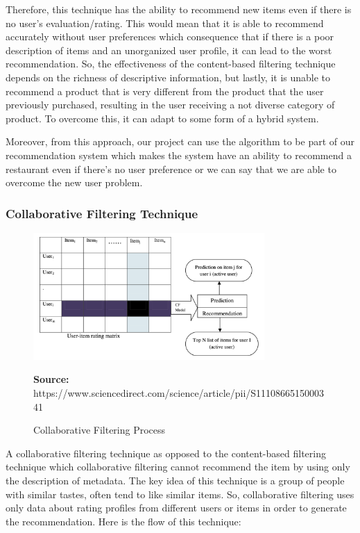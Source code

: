 \documentclass[12pt,oneside,openright,a4paper]{cpe-english-project}
\newcommand*{\captionsource}[2]{%
  \caption[{#1}]{#1}\vspace{-8pt}
  \textbf{Source:} #2}
\begin{document}
Therefore, this technique has the ability to recommend new items even if there is no user’s evaluation/rating. This would mean that it is able to recommend accurately without user preferences which consequence that if there is a poor description of items and an unorganized user profile, it can lead to the worst recommendation. So, the effectiveness of the content-based filtering technique depends on the richness of descriptive information, but lastly, it is unable to recommend a product that is very different from the product that the user previously purchased, resulting in the user receiving a not diverse category of product. To overcome this, it can adapt to some form of a hybrid system.

Moreover, from this approach, our project can use the algorithm to be part of our recommendation system which makes the system have an ability to recommend a restaurant even if there’s no user preference or we can say that we are able to overcome the new user problem.


\subsubsection{Collaborative Filtering Technique}

\begin{figure}[H]\centering
\includegraphics[width=250pt]{./images/2cfprocess.png}
\label{fig:2cfprocess}
\captionsource{Collaborative Filtering Process}{https://www.sciencedirect.com/science/article/pii/S1110866515000341}
\end{figure}

A collaborative filtering technique as opposed to the content-based filtering technique which collaborative filtering cannot recommend the item by using only the description of metadata. The key idea of this technique is a group of people with similar tastes, often tend to like similar items. So, collaborative filtering uses only data about rating profiles from different users or items in order to generate the recommendation. Here is the flow of this technique:
\end{document}
